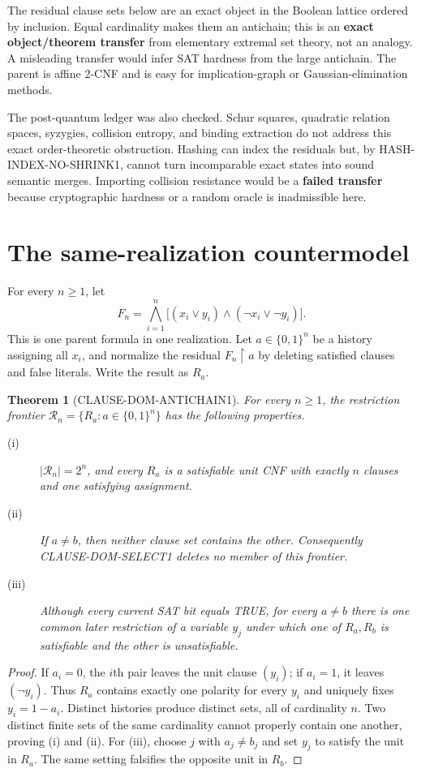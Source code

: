 \documentclass[11pt]{article}
\newtheorem{theorem}{Theorem}
\begin{document}
The residual clause sets below are an exact object in the Boolean lattice
ordered by inclusion.  Equal cardinality makes them an antichain; this is an
\textbf{exact object/theorem transfer} from elementary extremal set theory,
not an analogy.  A misleading transfer would infer SAT hardness from the
large antichain.  The parent is affine 2-CNF and is easy for implication-graph
or Gaussian-elimination methods.

The post-quantum ledger was also checked.  Schur squares, quadratic relation
spaces, syzygies, collision entropy, and binding extraction do not address
this exact order-theoretic obstruction.  Hashing can index the residuals but,
by HASH-INDEX-NO-SHRINK1, cannot turn incomparable exact states into sound
semantic merges.  Importing collision resistance would be a
\textbf{failed transfer} because cryptographic hardness or a random oracle is
inadmissible here.

\section{The same-realization countermodel}
For every $n\ge1$, let
\[
 F_n=\bigwedge_{i=1}^{n}
 \bigl[(x_i\vee y_i)\wedge(\neg x_i\vee\neg y_i)\bigr].
\]
This is one parent formula in one realization.  Let $a\in\{0,1\}^n$ be a
history assigning all $x_i$, and normalize the residual $F_n\upharpoonright a$
by deleting satisfied clauses and false literals.  Write the result as
$R_a$.

\begin{theorem}[CLAUSE-DOM-ANTICHAIN1]
For every $n\ge1$, the restriction frontier
$\mathcal R_n=\{R_a:a\in\{0,1\}^n\}$ has the following properties.
\begin{description}
\item[(i)] $|\mathcal R_n|=2^n$, and every $R_a$ is a satisfiable unit CNF
with exactly $n$ clauses and one satisfying assignment.
\item[(ii)] If $a\ne b$, then neither clause set contains the other.
Consequently CLAUSE-DOM-SELECT1 deletes no member of this frontier.
\item[(iii)] Although every current SAT bit equals TRUE, for every $a\ne b$
there is one common later restriction of a variable $y_j$ under which one of
$R_a,R_b$ is satisfiable and the other is unsatisfiable.
\end{description}
\end{theorem}
\begin{proof}
If $a_i=0$, the $i$th pair leaves the unit clause $(y_i)$; if $a_i=1$, it
leaves $(\neg y_i)$.  Thus $R_a$ contains exactly one polarity for every
$y_i$ and uniquely fixes $y_i=1-a_i$.  Distinct histories produce distinct
sets, all of cardinality $n$.  Two distinct finite sets of the same
cardinality cannot properly contain one another, proving (i) and (ii).
For (iii), choose $j$ with $a_j\ne b_j$ and set $y_j$ to satisfy the unit in
$R_a$.  The same setting falsifies the opposite unit in $R_b$.
\end{proof}
\end{document}
